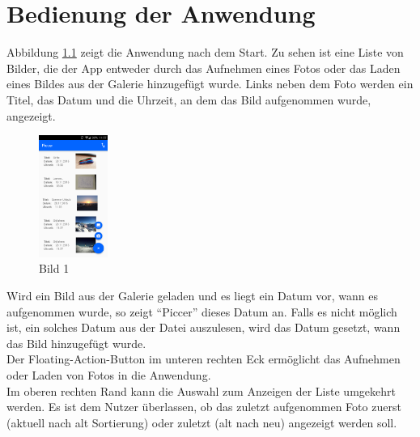 
\chapter{Bedienung der Anwendung}

Abbildung \ref{Bild1} zeigt die Anwendung nach dem Start. Zu sehen ist eine Liste von Bilder, die der App entweder durch das Aufnehmen eines Fotos oder das Laden eines Bildes aus der Galerie hinzugefügt wurde. Links neben dem Foto werden ein Titel, das Datum und die Uhrzeit, an dem das Bild aufgenommen wurde, angezeigt. \\

\begin{figure}
\label{Bild1}
\centering
\includegraphics[width=0.2\textwidth]{../images/bild_1}
\caption{Bild 1}


\end{figure}

Wird ein Bild aus der Galerie geladen und es liegt ein Datum vor, wann es aufgenommen wurde, so zeigt \enquote{Piccer} dieses Datum an. Falls es nicht möglich ist, ein solches Datum aus der Datei auszulesen, wird das Datum gesetzt, wann das Bild hinzugefügt wurde.
\\Der Floating-Action-Button im unteren rechten Eck ermöglicht das Aufnehmen oder Laden von Fotos in die Anwendung.
\\Im oberen rechten Rand kann die Auswahl zum Anzeigen der Liste umgekehrt werden. Es ist dem Nutzer überlassen, ob das zuletzt aufgenommen Foto zuerst (aktuell nach alt Sortierung) oder zuletzt (alt nach neu) angezeigt werden soll.
